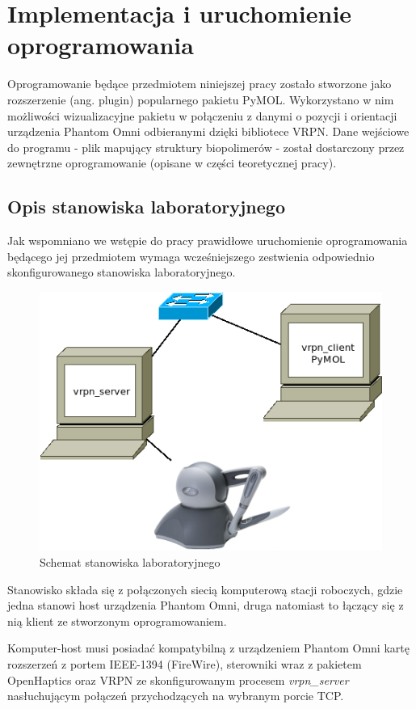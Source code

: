 \documentclass[licencjacka]{pracamgr}
\begin{document}
\chapter{Implementacja i uruchomienie oprogramowania}

Oprogramowanie będące przedmiotem niniejszej pracy zostało stworzone jako rozszerzenie (ang. plugin) popularnego pakietu PyMOL. Wykorzystano w nim możliwości wizualizacyjne pakietu w połączeniu z danymi o pozycji i orientacji urządzenia Phantom Omni odbieranymi dzięki bibliotece VRPN. Dane wejściowe do programu - plik mapujący struktury biopolimerów - został dostarczony przez zewnętrzne oprogramowanie (opisane w części teoretycznej pracy).

\section{Opis stanowiska laboratoryjnego}
Jak wspomniano we wstępie do pracy prawidłowe uruchomienie oprogramowania będącego jej przedmiotem wymaga wcześniejszego zestwienia odpowiednio skonfigurowanego stanowiska laboratoryjnego. 

\begin{figure}[H]
\centering
\includegraphics[scale=0.6,center]{stanowisko}
\caption{Schemat stanowiska laboratoryjnego}
\end{figure}

Stanowisko składa się z połączonych siecią komputerową stacji roboczych, gdzie jedna stanowi host urządzenia Phantom Omni, druga natomiast to łączący się z nią klient ze stworzonym oprogramowaniem. 

Komputer-host musi posiadać kompatybilną z urządzeniem Phantom Omni kartę rozszerzeń z portem IEEE-1394 (FireWire), sterowniki wraz z pakietem OpenHaptics oraz VRPN ze skonfigurowanym procesem \textit{vrpn\_server} nasłuchującym połączeń przychodzących na wybranym porcie TCP. 
\end{document}
